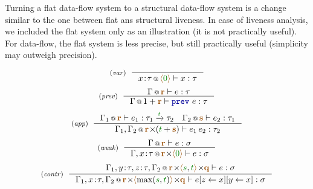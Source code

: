 Turning a flat data-flow system to a structural data-flow system is a change similar to the one
between flat ans structural liveness. In case of liveness analysis, we included the flat system
only as an illustration (it is not practically useful). For data-flow, the flat system is less 
precise, but still practically useful (simplicity may outweigh precision). 


\begin{figure}[t]
\begin{equation*}
\tyrule{var}{}
  {\coctx{x \!:\! \tau}{\alift{\cclrd{0}}} \vdash x : \tau} 
\end{equation*}
\begin{equation*}
\tyrule{prev}
  {\coctx{\Gamma}{\aclrd{\textbf{r}}} \vdash e : \tau}
  {\coctx{\Gamma}{1 + \aclrd{\textbf{r}}} \vdash \kvd{prev}~e : \tau}  
\end{equation*}
\begin{equation*}
\tyrule{app}
  { \coctx{\Gamma_1}{\aclrd{\textbf{r}}} \vdash e_1 : \tau_1 \xrightarrow{\cclrd{t}} \tau_2 \quad 
    \coctx{\Gamma_2}{\aclrd{\textbf{s}}} \vdash e_2 : \tau_1}
  { \coctx{\Gamma_1, \Gamma_2}{\aclrd{\textbf{r}} \cons (\cclrd{t} + \aclrd{\textbf{s}})} \vdash e_1 \, e_2 : \tau_2} 
\end{equation*}
\begin{equation*}
\tyrule{weak}
  {\coctx{\Gamma}{ \aclrd{\textbf{r}} } \vdash e : \sigma}
  {\coctx{\Gamma,x \!:\! \tau}{\aclrd{\textbf{r}} \cons \alift{ \cclrd{0} }} \vdash e : \sigma} 
\end{equation*}
\begin{equation*}
\tyrule{contr}
  {\coctx{\Gamma_1,y\!:\!\tau,z\!:\!\tau,\Gamma_2}{\aclrd{\textbf{r}} \cons \alift{\cclrd{s},\cclrd{t}} \cons \aclrd{\textbf{q}}} \vdash e : \sigma}
  {\coctx{\Gamma_1,x\!:\!\tau,\Gamma_2}{\aclrd{\textbf{r}} \cons \alift{\textnormal{max}(\cclrd{s},\cclrd{t})} \cons \aclrd{\textbf{q}}} \vdash \subst{\subst{e}{z}{x}}{y}{x} : \sigma}
\end{equation*}

\label{fig:applications-struct-df}
\vspace{-1em}
\end{figure}


